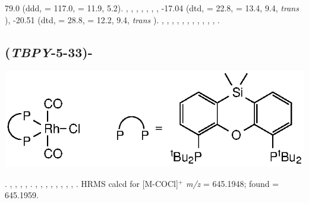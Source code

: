 79.0 (ddd, \JRhP{} = 117.0, \JPH{} = 11.9, 5.2).
,
,
,
,
,
,
,
-17.04 (dtd, \JRhH{} = 22.8, \JPH{} = 13.4, \JHH{} 9.4,  \emph{trans} ),
-20.51 (dtd, \JRhH{} = 28.8, \JPH{} = 12.2, \JHH{} 9.4,  \emph{trans} ).
,
,
,
,
,
,
,
,
,
,
,
.


\subsection*{(\emph{TBPY}-5-33)-}

\begin{structure}[h]
\begin{center}
\includegraphics{../Structures/RhCl(SitBu)(CO)2.eps}
\end{center}
\end{structure}

.
,
,
,
,
.
,
,
,
,
,
,
,
,
.
HRMS calcd for  [M-COCl]$^+$ \emph{m/z} = 645.1948; found = 645.1959.



